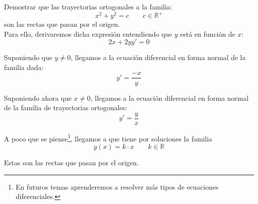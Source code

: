 \begin{ejemplo}
    Demostrar que las trayectorias ortogonales a la familia:
    \begin{equation*}
        x^2 + y^2 = c \qquad c\in \mathbb{R}^+
    \end{equation*}
    son las rectas que pasan por el origen.\\

    Para ello, derivaremos dicha expresión entendiendo que $y$ está en función de $x$:
    \begin{equation*}
        2x + 2yy' = 0
    \end{equation*}

    Suponiendo que $y\neq 0$, llegamos a la ecuación diferencial en forma normal de la familia dada:
    \begin{equation*}
        y' = \dfrac{-x}{y}
    \end{equation*}

    Suponiendo ahora que $x\neq 0$, llegamos a la ecuación diferencial en forma normal de la familia de trayectorias ortogonales:
    \begin{equation*}
        y' = \dfrac{y}{x}
    \end{equation*}

    A poco que se piense\footnote{En futuros temas aprenderemos a resolver más tipos de ecuaciones diferenciales.}, llegamos a que tiene por soluciones la familia
    \begin{equation*}
        y(x) = k\cdot x \qquad k\in \mathbb{R}
    \end{equation*}
    
    Estas son las rectas que pasan por el origen.
\end{ejemplo}

